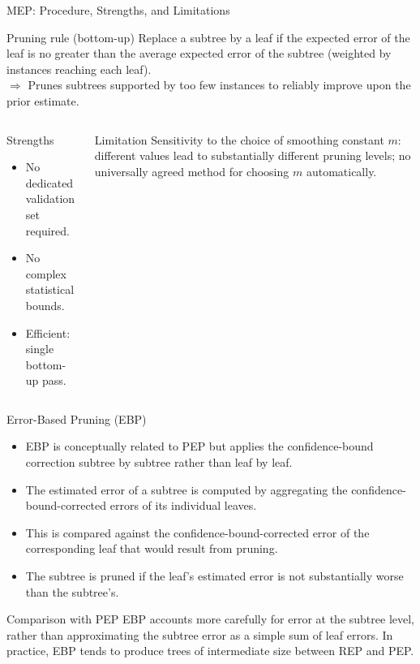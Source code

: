 \begin{frame}{MEP: Procedure, Strengths, and Limitations}
  \begin{block}{Pruning rule (bottom-up)}
    Replace a subtree by a leaf if the \alert{expected error of the leaf} is no greater than
    the average expected error of the subtree (weighted by instances reaching each leaf).\\
    $\Rightarrow$ Prunes subtrees supported by too few instances to reliably improve upon
    the prior estimate.
  \end{block}
  \begin{columns}[t]
      \begin{block}{Strengths}
        \begin{itemize}
          \item No dedicated validation set required.
          \item No complex statistical bounds.
          \item Efficient: single bottom-up pass.
        \end{itemize}
      \end{block}
      \begin{alertblock}{Limitation}
        Sensitivity to the choice of smoothing constant $m$: different values lead to
        substantially different pruning levels; \alert{no universally agreed method} for
        choosing $m$ automatically.
      \end{alertblock}
  \end{columns}
\end{frame}

\begin{frame}{Error-Based Pruning (EBP)}
  \begin{itemize}
    \item EBP is conceptually related to PEP but applies the confidence-bound correction
          \alert{subtree by subtree} rather than leaf by leaf.
    \item The estimated error of a subtree is computed by \alert{aggregating} the confidence-bound-corrected
          errors of its individual leaves.
    \item This is compared against the confidence-bound-corrected error of the corresponding leaf
          that would result from pruning.
    \item The subtree is pruned if the leaf's estimated error is \alert{not substantially worse}
          than the subtree's.
  \end{itemize}
  \begin{block}{Comparison with PEP}
    EBP accounts more carefully for error at the \alert{subtree level}, rather than approximating the
    subtree error as a simple sum of leaf errors. In practice, EBP tends to produce trees of
    \alert{intermediate size} between REP and PEP.
  \end{block}
\end{frame}


